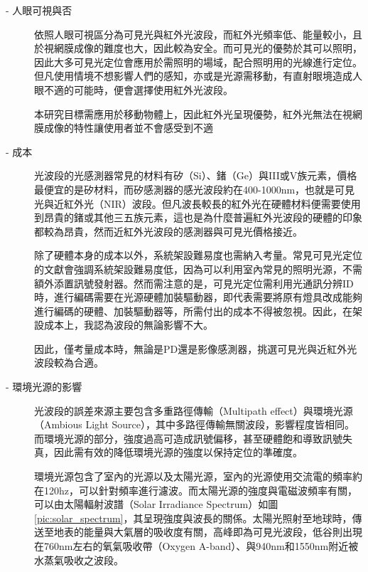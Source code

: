             \begin{description}

                \item[- 人眼可視與否]\hfill 
                
                \qquad
                依照人眼可視區分為可見光與紅外光波段，而紅外光頻率低、能量較小，且於視網膜成像的難度也大，因此較為安全。而可見光的優勢於其可以照明，因此大多可見光定位會應用於需照明的場域，配合照明用的光線進行定位。但凡使用情境不想影響人們的感知，亦或是光源需移動，有直射眼境造成人眼不適的可能時，便會選擇使用紅外光波段。

                \qquad 
                本研究目標需應用於移動物體上，因此紅外光呈現優勢，紅外光無法在視網膜成像的特性讓使用者並不會感受到不適

                \item[- 成本] \hfill 
                
                \qquad
                光波段的光感測器常見的材料有矽（Si）、鍺（Ge）與III或V族元素，價格最便宜的是矽材料，而矽感測器的感光波段約在400-1000nm，也就是可見光與近紅外光（NIR）波段。但凡波長較長的紅外光在硬體材料便需要使用到昂貴的鍺或其他三五族元素\cite{si_pd}，這也是為什麼普遍紅外光波段的硬體的印象都較為昂貴，然而近紅外光波段的感測器與可見光價格接近。

                \qquad
                除了硬體本身的成本以外，系統架設難易度也需納入考量。常見可見光定位的文獻會強調系統架設難易度低，因為可以利用室內常見的照明光源，不需額外添置訊號發射器\cite{vlc_adv}。然而需注意的是，可見光定位需利用光通訊分辨ID時，進行編碼需要在光源硬體加裝驅動器，即代表需要將原有燈具改成能夠進行編碼的硬體、加裝驅動器等，所需付出的成本不得被忽視。因此，在架設成本上，我認為波段的無論影響不大。
                
                \qquad
                因此，僅考量成本時，無論是PD還是影像感測器，挑選可見光與近紅外光波段較為合適。
        
                \item[- 環境光源的影響] \hfill 
                
                \qquad
                光波段的誤差來源主要包含多重路徑傳輸（Multipath effect）與環境光源（Ambious Light Source）\cite{survey_light2020}，其中多路徑傳輸無關波段，影響程度皆相同。而環境光源的部分，強度過高可造成訊號偏移，甚至硬體飽和導致訊號失真，因此需有效的降低環境光源的強度以保持定位的準確度。
            
                

                \qquad
                環境光源包含了室內的光源以及太陽光源，室內的光源使用交流電的頻率約在120hz，可以針對頻率進行濾波。而太陽光源的強度與電磁波頻率有關，可以由太陽輻射波譜（Solar Irradiance Spectrum）如圖\ref{pic:solar_spectrum}，其呈現強度與波長的關係。太陽光照射至地球時，傳送至地表的能量與大氣層的吸收度有關，高峰即為可見光波段，低谷則出現在760nm左右的氧氣吸收帶（Oxygen A-band）、與940nm和1550nm附近被水蒸氣吸收之波段\cite{book:solar_spectrum}。
                

\end{description}
